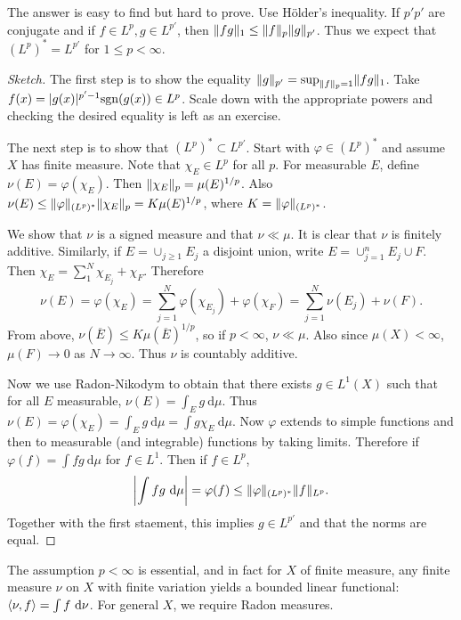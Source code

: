 \documentclass[10pt, twoside]{article}
\renewcommand{\d}{\ \mathrm{d}}
\begin{document}
    \begin{exm}[Dual of $L^p(X, \mu)$]
        The answer is easy to find but hard to prove. Use H\"older's inequality. If $p'p'$ are conjugate and if $f \in L^p, g \in L^{p'}$, then $\lVert fg\rVert_1 \leq \lVert f\rVert_p \lVert g\rVert_{p'}$. Thus we expect that $(L^p)^* = L^{p'}$ for $1 \leq p < \infty$.

        \begin{proof}[Sketch]
            The first step is to show the equality $\lVert g\rVert_{p'} = \sup_{\lVert f\rVert_p = 1} \lVert fg\rVert_1$. Take $f(x) = \lvert g(x)\rvert^{p'-1} \mathrm{sgn}(g(x)) \in L^p$. Scale down with the appropriate powers and checking the desired equality is left as an exercise.
            
            The next step is to show that $(L^p)^* \subset L^{p'}$. Start with $\varphi \in (L^p)^*$ and assume $X$ has finite measure. Note that $\chi_E \in L^p$ for all $p$. For measurable $E$, define $\nu(E) = \varphi(\chi_E)$. Then $\lVert\chi_E\rVert_p = \mu(E)^{1/p}$. Also $\nu(E) \leq \lVert\varphi\rVert_{(L^p)^*} \lVert\chi_E\rVert_p = K \mu(E)^{1/p}$, where $K = \lVert\varphi\rVert_{(L^p)^*}$.
            
            We show that $\nu$ is a signed measure and that $\nu \ll \mu$. It is clear that $\nu$ is finitely additive. Similarly, if $E = \cup_{j \geq 1} E_j$ a disjoint union, write $E = \cup_{j=1}^n E_j \cup F$. Then $\chi_E = \sum_{1}^N \chi_{E_j} + \chi_F$. Therefore \[ \nu(E) = \varphi(\chi_E) = \sum_{j=1}^N \varphi(\chi_{E_j}) + \varphi(\chi_F) = \sum_{j=1}^N \nu(E_j) + \nu(F).\] From above, $\nu(\overline{E}) \leq K \mu(\overline{E})^{1/p}$, so if $p < \infty$, $\nu \ll \mu$. Also since $\mu(X) < \infty$, $\mu(F) \to 0$ as $N \to \infty$. Thus $\nu$ is countably additive.

            Now we use Radon-Nikodym to obtain that there exists $g \in L^1(X)$ such that for all $E$ measurable, $\nu(E) = \int_E g \d\mu$. Thus $\nu(E) = \varphi(\chi_E) = \int_E g \d\mu = \int g \chi_E \d\mu$. Now $\varphi$ extends to simple functions and then to measurable (and integrable) functions by taking limits. Therefore if $\varphi(f) = \int fg \d\mu$ for $f \in L^1$. Then if $f \in L^p$, \[\abs*{\int fg \d \mu} = \varphi(f) \leq \norm{\varphi}_{(L^p)^*} \norm{f}_{L^p}. \] Together with the first staement, this implies $g \in L^{p'}$ and that the norms are equal.
        \end{proof}
    \end{exm}

    \begin{rmk}
        The assumption $p < \infty$ is essential, and in fact for $X$ of finite measure, any finite measure $\nu$ on $X$ with finite variation yields a bounded linear functional: $\gen{\nu,f} = \int f \d \nu$. For general $X$, we require Radon measures.
    \end{rmk}
    
\end{document}
